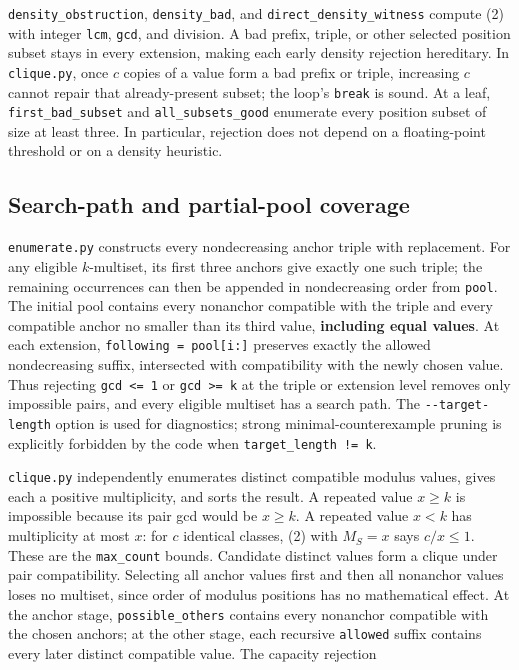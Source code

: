 \documentclass[11pt,a4paper]{article}
\begin{document}
\texttt{density\_obstruction}, \texttt{density\_bad}, and \texttt{direct\_density\_witness} compute (2) with integer \texttt{lcm}, \texttt{gcd}, and division. A bad prefix, triple, or other selected position subset stays in every extension, making each early density rejection hereditary. In \texttt{clique.py}, once \(c\) copies of a value form a bad prefix or triple, increasing \(c\) cannot repair that already-present subset; the loop's \texttt{break} is sound. At a leaf, \texttt{first\_bad\_subset} and \texttt{all\_subsets\_good} enumerate every position subset of size at least three. In particular, rejection does not depend on a floating-point threshold or on a density heuristic.

\subsection{Search-path and partial-pool coverage}\label{search-path-and-partial-pool-coverage}

\texttt{enumerate.py} constructs every nondecreasing anchor triple with replacement. For any eligible \(k\)-multiset, its first three anchors give exactly one such triple; the remaining occurrences can then be appended in nondecreasing order from \texttt{pool}. The initial pool contains every nonanchor compatible with the triple and every compatible anchor no smaller than its third value, \textbf{including equal values}. At each extension, \texttt{following\ =\ pool{[}i:{]}} preserves exactly the allowed nondecreasing suffix, intersected with compatibility with the newly chosen value. Thus rejecting \texttt{gcd\ \textless{}=\ 1} or \texttt{gcd\ \textgreater{}=\ k} at the triple or extension level removes only impossible pairs, and every eligible multiset has a search path. The \texttt{-\/-target-length} option is used for diagnostics; strong minimal-counterexample pruning is explicitly forbidden by the code when \texttt{target\_length\ !=\ k}.

\texttt{clique.py} independently enumerates distinct compatible modulus values, gives each a positive multiplicity, and sorts the result. A repeated value \(x\ge k\) is impossible because its pair gcd would be \(x\ge k\). A repeated value \(x<k\) has multiplicity at most \(x\): for \(c\) identical classes, (2) with \(M_S=x\) says \(c/x\le1\). These are the \texttt{max\_count} bounds. Candidate distinct values form a clique under pair compatibility. Selecting all anchor values first and then all nonanchor values loses no multiset, since order of modulus positions has no mathematical effect. At the anchor stage, \texttt{possible\_others} contains every nonanchor compatible with the chosen anchors; at the other stage, each recursive \texttt{allowed} suffix contains every later distinct compatible value. The capacity rejection
\end{document}
